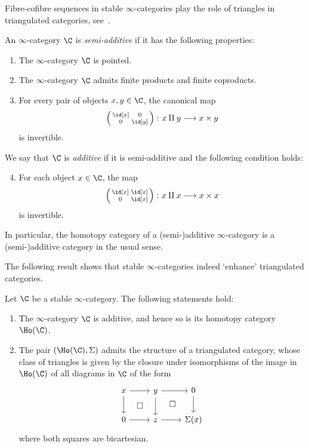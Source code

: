 \documentclass[a4paper]{amsart}
\begin{document}
\begin{remark}
  Fibre-cofibre sequences in stable $\infty$-categories play the role of
  triangles in triangulated categories,
  see~.
\end{remark}

\begin{definition}
  An $\infty$-category $\C$ is \emph{semi-additive} if it has the following
  properties:
  \begin{enumerate}
  \item The $\infty$-category $\C$ is pointed.
  \item The $\infty$-category $\C$ admits finite products and finite coproducts.
  \item For every pair of objects $x,y\in\C$, the canonical map
    \[
      \left(\begin{smallmatrix} \id[x]&0\\0&\id[y]
      \end{smallmatrix}\right)\colon x\amalg y\longrightarrow x\times y
  \]
  is invertible.
\end{enumerate}
We say that $\C$ is \emph{additive} if it is semi-additive and the following
condition holds:
\begin{enumerate}
  \setcounter{enumi}{3}
\item For each object $x\in\C$, the map
  \[
    \left(\begin{smallmatrix}\id[x]&\id[x]\\
      0&\id[x]
    \end{smallmatrix}\right)\colon x\amalg x\longrightarrow x\times x
\]
is invertible.
\end{enumerate}
In particular, the homotopy category of a (semi-)additive $\infty$-category is a
(semi-)additive category in the usual sense.
\end{definition}

The following result shows that stable $\infty$-categories indeed `enhance'
triangulated categories.

\begin{theorem}
  \label{thm:triangulated_homotopy_categories}
  Let $\C$ be a stable $\infty$-category. The following statements hold:
  \begin{enumerate}
  \item The $\infty$-category $\C$ is additive, and hence so is its homotopy
    category $\Ho(\C)$.
  \item The pair $(\Ho(\C),\Sigma)$ admits the structure of a triangulated
    category, whose class of triangles is given by the closure under
    isomorphisms of the image in $\Ho(\C)$ of all diagrams in $\C$ of the form
    \[
      \begin{tikzcd}
        x\rar\dar\ar[phantom]{dr}[description]{\square}&y\rar\dar\ar[phantom]{dr}[description]{\square}&0\dar\\
        0\rar&z\rar&\Sigma(x)
      \end{tikzcd}
    \]
    where both squares are bicartesian.
  \end{enumerate}
\end{theorem}
\end{document}
